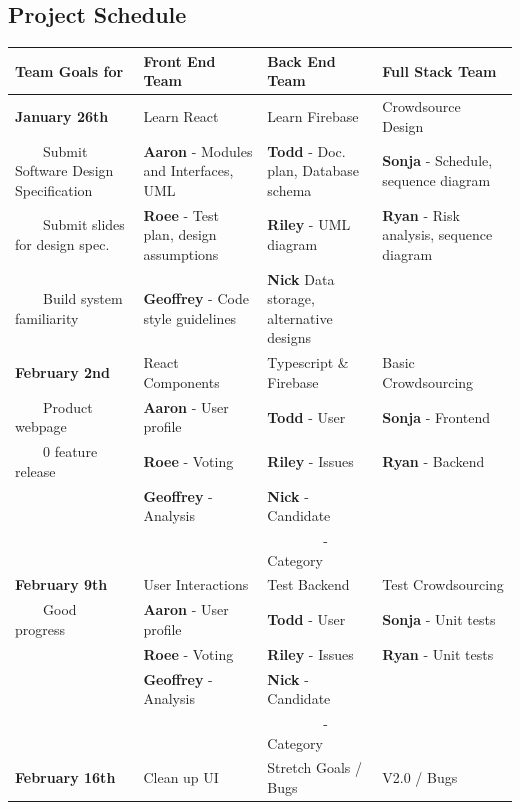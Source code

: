 \documentclass[11pt]{article}
\begin{document}
\subsection{Project Schedule}
\newcommand{\tabitem}{~~\llap{\textbullet}~~}
\begin{tabular}[t]{|L{1.45in}|L{1.45in}|L{1.45in}|L{1.45in}|}
    \hline
    \textbf{Team Goals for} & \textbf{Front End Team} & \textbf{Back End Team} & \textbf{Full Stack Team}\\
    \hline
    \textbf{January 26th} & Learn React & Learn Firebase & Crowdsource Design\\
    \tabitem Submit Software Design Specification & \textbf{Aaron} - Modules and Interfaces, UML & \textbf{Todd} - Doc. plan, Database schema & \textbf{Sonja} - Schedule, sequence diagram\\
    \tabitem Submit slides for design spec. & \textbf{Roee} - Test plan, design assumptions & \textbf{Riley} - UML diagram & \textbf{Ryan} - Risk analysis, sequence diagram\\
    \tabitem Build system familiarity & \textbf{Geoffrey} - Code style guidelines & \textbf{Nick} Data storage, alternative designs & \\
    \hline
    \textbf{February 2nd} & React Components & Typescript \& Firebase & Basic Crowdsourcing\\
    \tabitem Product webpage & \textbf{Aaron} - User profile & \textbf{Todd} - User & \textbf{Sonja} - Frontend\\
    \tabitem 0 feature release & \textbf{Roee} - Voting & \textbf{Riley} - Issues & \textbf{Ryan} - Backend\\
    & \textbf{Geoffrey} - Analysis & \textbf{Nick} - Candidate & \\
    & &\ \ \ \ \ \ \ \ - Category & \\
    \hline
    \textbf{February 9th} & User Interactions & Test Backend & Test Crowdsourcing\\
    \tabitem Good progress & \textbf{Aaron} - User profile & \textbf{Todd} - User & \textbf{Sonja} - Unit tests\\
    & \textbf{Roee} - Voting & \textbf{Riley} - Issues & \textbf{Ryan} - Unit tests\\
    & \textbf{Geoffrey} - Analysis & \textbf{Nick} - Candidate & \\
    & &\ \ \ \ \ \ \ \ - Category & \\
    \hline
    \textbf{February 16th} & Clean up UI & Stretch Goals / Bugs & V2.0 / Bugs\\

\end{tabular}
\end{document}
